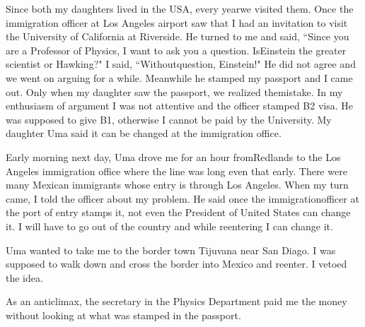 Since both my daughters lived in the USA, every year\break we visited them. 
Once the immigration officer at Los Angeles airport saw that I had an 
invitation to visit the University of California at Riverside. He turned 
to me and said, ``Since you are a Professor of Physics, I want to ask you 
a question. Is\break Einstein the greater scientist or Hawking?" I 
said, ``Without\break question, Einstein!" He did not agree and we went on 
arguing for a while. Meanwhile he stamped my passport and I came out. 
Only when my daughter saw the passport, we realized the\break mistake. In my 
enthusiasm of argument I was not attentive and the officer stamped B2 
visa. He was supposed to give B1, otherwise I cannot be paid by the 
University. My daughter Uma said it can be changed at the immigration 
office.
\smallskip

Early morning next day, Uma drove me for an hour from\break Redlands to the 
Los Angeles immigration office where the line was long even that early. 
There were many Mexican immigrants whose entry is through Los Angeles. 
When my turn came, I told the officer about my problem. He said once the 
immigration\break officer at the port of entry stamps it, not even the 
President of United States can change it. I will have to go out of the 
country and while reentering I can change it.


Uma wanted to take me to the border town Tijuvana near San Diago. I was 
supposed to walk down and cross the border into Mexico and reenter. I 
vetoed the idea.


As an anticlimax, the secretary in the Physics Department paid me the 
money without looking at what was stamped in the passport.

